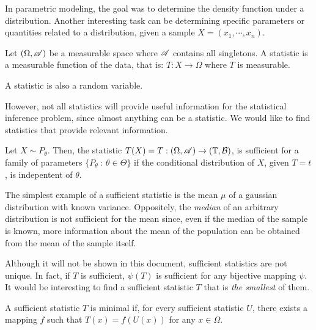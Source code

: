 In parametric modeling, the goal was to determine the density function under a distribution. Another interesting task can be determining specific parameters or quantities related to a distribution, given a sample $X = (x_1,\cdots,x_n)$.

\begin{ndef}
    Let $(\Omega,\mathscr{A})$ be a measurable space where $\mathscr{A}$ contains all singletons. A statistic is a measurable function of the data, that is: $T: X \to \Omega$ where $T$ is measurable.
\end{ndef}
\begin{remark}
    A statistic is also a random variable.
\end{remark}

However, not all statistics will provide useful information for the statistical inference problem, since almost anything can be a statistic. We would like to find statistics that provide relevant information.

\begin{ndef}
    Let $X \sim P_\theta$. Then, the statistic $T(X) = T : (\Omega, \mathscr{A}) \to (\mathbb T, \mathcal B)$, is sufficient for a family of parameters $\{P_\theta \ : \ \theta \in \Theta \}$ if the conditional distribution of $X$, given $T = t$, is indepentent of $\theta$.\\
\end{ndef}

\begin{nexample}
The simplest example of a sufficient statistic is the mean $\mu$ of a gaussian distribution with known variance. Oppositely, the \emph{median} of an arbitrary distribution
is not sufficient for the mean since, even if the median of the sample is known, more information about the mean of the population can be obtained from the mean of the sample itself.
\end{nexample}

Although it will not be shown in this document, sufficient statistics are not unique. In fact, if $T$ is sufficient, $\psi(T)$ is sufficient for any bijective mapping $\psi$. It would be interesting to find a sufficient statistic $T$ that is \emph{the smallest} of them.

\begin{ndef}
    A sufficient statistic $T$ is minimal if, for every sufficient statistic $U$, there exists a mapping $f$ such that $T(x) = f(U(x))$ for any $x \in \Omega$.
\end{ndef}